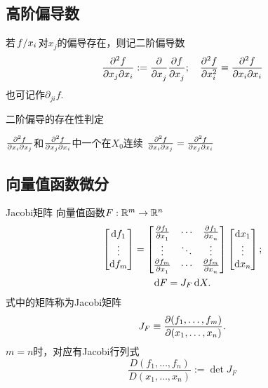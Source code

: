 \subsection{高阶偏导数}
\begin{definition}{}{}
	若$\left.f\middle\slash x_i\right.$对$x_j$的偏导存在，则记二阶偏导数
	\[\pw f{x_j}{x_i}:=\pp{x_j}\pv f{x_j};\quad \pu2 f{x_i}\equiv\pw f{x_i}{x_i}\]
	也可记作$\partial_{ji}f.$
\end{definition}
\begin{theorem}{二阶偏导的存在性判定}{}
	\begin{center}
		$\frac{\partial^2 f}{\partial x_i\partial x_j}$和$\frac{\partial^2 f}{\partial x_j\partial x_i}$中一个在$X_0$连续
		\vthus
		$\frac{\partial^2 f}{\partial x_i\partial x_j}=\frac{\partial^2 f}{\partial x_j\partial x_i}$
	\end{center}
\end{theorem}
\subsection{向量值函数微分}
\begin{definition}{Jacobi矩阵}{}
	向量值函数$F:\mathbb R^m\to\mathbb R^n$%
	\begin{gather*}
		\begin{bmatrix}
			\text df_1 \\
			\vdots     \\
			\text df_m
		\end{bmatrix}=
		\begin{bmatrix}
			\pv{f_1}{x_1} & \cdots & \pv{f_1}{x_n} \\
			\vdots                & \ddots & \vdots                \\
			\pv{f_m}{x_1} & \cdots & \pv{f_m}{x_n}
		\end{bmatrix}
		\begin{bmatrix}
			\d x_1 \\
			\vdots \\
			\d x_n
		\end{bmatrix};\\
		\d F=J_F\d X.
	\end{gather*}
	式中的矩阵称为Jacobi矩阵
	\[J_F\equiv\frac{\partial(f_1,\ldots,f_m)}{\partial(x_1,\ldots,x_n)}.\]
	$m=n$时，对应有Jacobi行列式
	\[\frac{D(f_1,\ldots,f_n)}{D(x_1,\ldots,x_n)}:=\det J_F\]
\end{definition}
